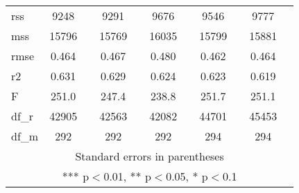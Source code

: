\documentclass[]{article}
\begin{document}
\begin{tabular}{lcccccccccc}
rss & 9248 &  & 9291 &  & 9676 &  & 9546 &  & 9777 &  \\
mss & 15796 &  & 15769 &  & 16035 &  & 15799 &  & 15881 &  \\
rmse & 0.464 &  & 0.467 &  & 0.480 &  & 0.462 &  & 0.464 &  \\
r2 & 0.631 &  & 0.629 &  & 0.624 &  & 0.623 &  & 0.619 &  \\
F & 251.0 &  & 247.4 &  & 238.8 &  & 251.7 &  & 251.1 &  \\
df\_r & 42905 &  & 42563 &  & 42082 &  & 44701 &  & 45453 &  \\
 df\_m & 292 &  & 292 &  & 292 &  & 294 &  & 294 &  \\ \hline
\multicolumn{11}{c}{ Standard errors in parentheses} \\
\multicolumn{11}{c}{ *** p$<$0.01, ** p$<$0.05, * p$<$0.1} \\
\end{tabular}
\end{document}
